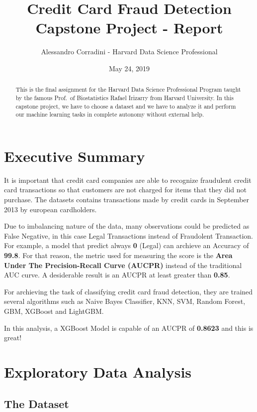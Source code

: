 \documentclass[]{article}
\title{Credit Card Fraud Detection Capstone Project - Report}
\author{Alessandro Corradini - Harvard Data Science Professional}
\date{May 24, 2019}
\begin{document}
\maketitle
\begin{abstract}
This is the final assignment for the Harvard Data Science Professional
Program taught by the famous Prof.~of Biostatistics Rafael Irizarry from
Harvard University. In this capstone project, we have to choose a
dataset and we have to analyze it and perform our machine learning tasks
in complete autonomy without external help.
\end{abstract}

{
\setcounter{tocdepth}{2}
\tableofcontents
}
\newpage

\hypertarget{executive-summary}{%
\section{Executive Summary}\label{executive-summary}}

It is important that credit card companies are able to recognize
fraudulent credit card transactions so that customers are not charged
for items that they did not purchase. The datasets contains transactions
made by credit cards in September 2013 by european cardholders.

Due to imbalancing nature of the data, many observations could be
predicted as False Negative, in this case Legal Transactions instead of
Fraudolent Transaction. For example, a model that predict always
\textbf{0} (Legal) can archieve an Accuracy of \textbf{99.8}. For that
reason, the metric used for measuring the score is the \textbf{Area
Under The Precision-Recall Curve (AUCPR)} instead of the traditional AUC
curve. A desiderable result is an AUCPR at least greater than
\textbf{0.85}.

For archieving the task of classifying credit card fraud detection, they
are trained several algorithms such as Naive Bayes Classifier, KNN, SVM,
Random Forest, GBM, XGBoost and LightGBM.

In this analysis, a XGBoost Model is capable of an AUCPR of
\textbf{0.8623} and this is great!

\hypertarget{exploratory-data-analysis}{%
\section{Exploratory Data Analysis}\label{exploratory-data-analysis}}

\hypertarget{the-dataset}{%
\subsection{The Dataset}\label{the-dataset}}
\end{document}
